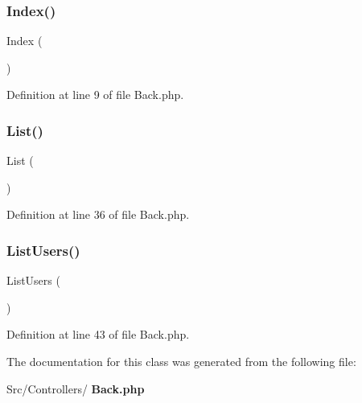 \subsubsection{Index()}
{\footnotesize\ttfamily Index (\begin{DoxyParamCaption}{ }\end{DoxyParamCaption})}



Definition at line 9 of file Back.\+php.

\mbox{\label{class_src_1_1_controllers_1_1_back_a17e6c90f14225bdac5c65ed915b0a2f6}} 
\subsubsection{List()}
{\footnotesize\ttfamily List (\begin{DoxyParamCaption}{ }\end{DoxyParamCaption})}



Definition at line 36 of file Back.\+php.

\mbox{\label{class_src_1_1_controllers_1_1_back_abfd4f6736a8cd4dc4fa1e012996f4a23}} 
\subsubsection{List\+Users()}
{\footnotesize\ttfamily List\+Users (\begin{DoxyParamCaption}{ }\end{DoxyParamCaption})}



Definition at line 43 of file Back.\+php.



The documentation for this class was generated from the following file\+:\begin{DoxyCompactItemize}
\item 
Src/\+Controllers/\textbf{ Back.\+php}\end{DoxyCompactItemize}
